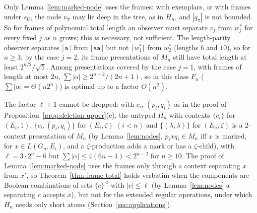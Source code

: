 \documentclass[11pt]{article}
\numberwithin{equation}{section}
\theoremstyle{plain}
\theoremstyle{definition}
\theoremstyle{remark}
\theoremstyle{plain}
\newcommand{\eps}{\lambda}
\newcommand{\Lc}{^{\lhd}}
\newcommand{\Lfl}{\lfloor}
\newcommand{\Rfl}{\rfloor}
\newcommand{\Lce}{\lceil}
\newcommand{\Rce}{\rceil}
\newcommand{\ta}{\mathtt a}
\begin{document}
Only Lemma~\ref{lem:marked-node} uses the frames: with exemplars, or with
frames under $s_U$, the node $\nu_\pi$ may lie deep in the tree, as in
$H_n$, and $|q_\pi|$ is not bounded.  So for frames of polynomial total
length an observer must separate $v_j$ from $w^*_j$ for every fixed $j$ as
$n$ grows; this is necessary, not sufficient.  The length-parity observer separates $\Lce\ta\Rce$ from $\Lfl\ta\ta\Rfl$ but not
$\Lce w^*_1\Rce$ from $w^*_2$ (lengths $6$ and $10$), so for $n\ge3$, by the
case $j=2$, its frame presentations of $M_n$ still have total length at
least $2^{n/2}/\sqrt5$.  Among presentations covered by the case $j=1$, with
frames of length at most $2n$, $\sum|\alpha|\ge2^{n-2}/(2n+1)$, so in this
class $F_n$
($\sum|\alpha|=\Theta(n2^n)$) is optimal up to a factor $O(n^2)$.

The factor $\ell+1$ cannot be dropped: with $c_i$, $(p_i,q_i)$ as in the
proof of Proposition~\ref{prop:deletion-upper}(c), the untyped $H_n$ with
contexts $\{c_i\}$ for $(E_i,1)$, $\{c_i,(p_i,q_i)\}$ for $(E_i,\zeta)$
$(i<n)$ and $\{(\eps,\eps)\}$ for $(E_n,\zeta)$ is a $2$-context presentation
of $M_n$ (by Lemma~\ref{lem:nodes}, $p_ixq_i\in M_n$ iff $x$ is marked, for $x\in L(G_n,E_i)$, and a
$\zeta$-production adds a mark or has a $\zeta$-child), with
$\ell=3\cdot2^n-6$ but $\sum|\alpha|\le4(6n-4)<2^{n-2}$ for $n\ge10$.
The proof of Lemma~\ref{lem:marked-node} uses the frames only through a
context separating $x$ from $x'$, so Theorem~\ref{thm:frame-total} holds
verbatim when the components are Boolean combinations of sets $\{c\}\Lc$ with
$|c|\le\ell$ (by Lemma~\ref{lem:nodes} a separating $c$ accepts $x$), but not
for the extended regular operations, under which $H_n$ needs only short
atoms (Section~\ref{sec:applications}).
\end{document}
